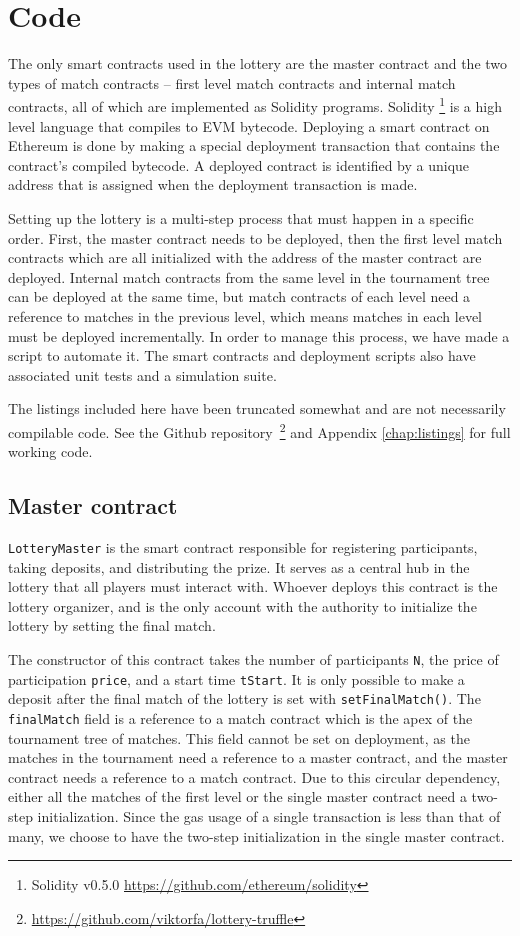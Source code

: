 \section{Code}
\label{sec:code}

The only smart contracts used in the lottery are the master contract and the two types of match contracts – first level match contracts and internal match contracts, all of which are implemented as Solidity programs. Solidity \footnote{Solidity v0.5.0 \url{https://github.com/ethereum/solidity}} is a high level language that compiles to EVM bytecode. Deploying a smart contract on Ethereum is done by making a special deployment transaction that contains the contract's compiled bytecode. A deployed contract is identified by a unique address that is assigned when the deployment transaction is made.

Setting up the lottery is a multi-step process that must happen in a specific order. First, the master contract needs to be deployed, then the first level match contracts which are all initialized with the address of the master contract are deployed. Internal match contracts from the same level in the tournament tree can be deployed at the same time, but match contracts of each level need a reference to matches in the previous level, which means matches in each level must be deployed incrementally. In order to manage this process, we have made a script to automate it. The smart contracts and deployment scripts also have associated unit tests and a simulation suite.

The listings included here have been truncated somewhat and are not necessarily compilable code. See the Github repository~\footnote{\url{https://github.com/viktorfa/lottery-truffle}} and Appendix \ref{chap:listings} for full working code.

\subsection{Master contract}
\texttt{LotteryMaster} is the smart contract responsible for registering participants, taking deposits, and distributing the prize. It serves as a central hub in the lottery that all players must interact with. Whoever deploys this contract is the lottery organizer, and is the only account with the authority to initialize the lottery by setting the final match. 

The constructor of this contract takes the number of participants \texttt{N}, the price of participation \texttt{price}, and a start time \texttt{tStart}. It is only possible to make a deposit after the final match of the lottery is set with \texttt{setFinalMatch()}. The \texttt{finalMatch} field is a reference to a match contract which is the apex of the tournament tree of matches. This field cannot be set on deployment, as the matches in the tournament need a reference to a master contract, and the master contract needs a reference to a match contract. Due to this circular dependency, either all the matches of the first level or the single master contract need a two-step initialization. Since the gas usage of a single transaction is less than that of many, we choose to have the two-step initialization in the single master contract.


